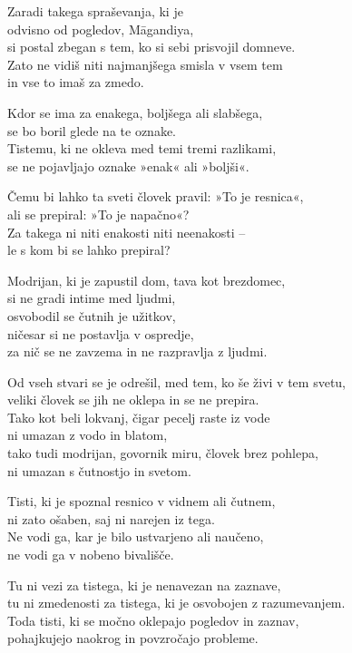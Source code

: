 Zaradi takega spraševanja, ki je\\\vin odvisno od pogledov, Māgandiya,\\
si postal zbegan s tem, ko si sebi prisvojil domneve.\\
Zato ne vidiš niti najmanjšega smisla v vsem tem\\
in vse to imaš za zmedo.

Kdor se ima za enakega, boljšega ali slabšega,\\
se bo boril glede na te oznake.\\
Tistemu, ki ne okleva med temi tremi razlikami,\\
se ne pojavljajo oznake »enak« ali »boljši«.

Čemu bi lahko ta sveti človek pravil: »To je resnica«,\\
ali se prepiral: »To je napačno«?\\
Za takega ni niti enakosti niti neenakosti --\\
le s kom bi se lahko prepiral?

Modrijan, ki je zapustil dom, tava kot brezdomec,\\
si ne gradi intime med ljudmi,\\
osvobodil se čutnih je užitkov,\\\vin ničesar si ne postavlja v ospredje,\\
za nič se ne zavzema in ne razpravlja z ljudmi.

Od vseh stvari se je odrešil, med tem, ko še živi v tem svetu,\\
veliki človek se jih ne oklepa in se ne prepira.\\
Tako kot beli lokvanj, čigar pecelj raste iz vode\\
ni umazan z vodo in blatom,\\
tako tudi modrijan, govornik miru, človek brez pohlepa,\\
ni umazan s čutnostjo in svetom.

\clearpage

Tisti, ki je spoznal resnico v vidnem ali čutnem,\\
ni zato ošaben, saj ni narejen iz tega.\\
Ne vodi ga, kar je bilo ustvarjeno ali naučeno,\\
ne vodi ga v nobeno bivališče.

Tu ni vezi za tistega, ki je nenavezan na zaznave,\\
tu ni zmedenosti za tistega, ki je osvobojen z razumevanjem.\\
Toda tisti, ki se močno oklepajo pogledov in zaznav,\\
pohajkujejo naokrog in povzročajo probleme.

